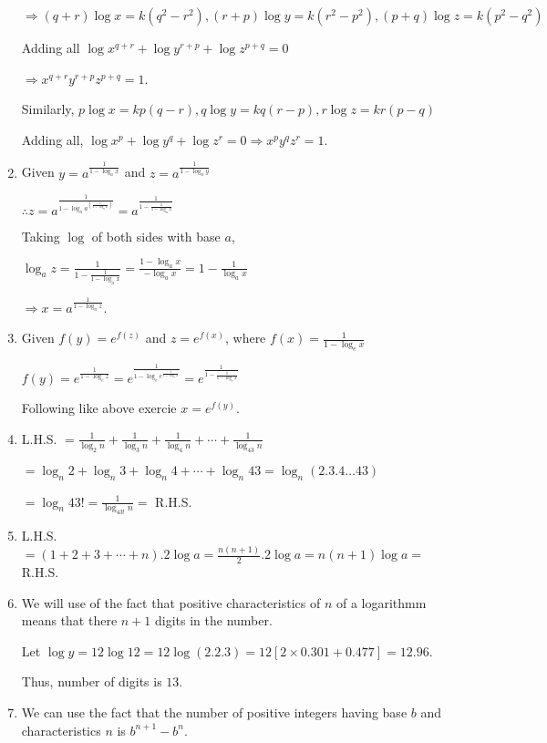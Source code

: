 \begin{enumerate}
  $\Rightarrow (q + r)\log x = k(q^2 - r^2), (r + p)\log y = k(r^2 - p^2), (p + q)\log z = k(p^2 - q^2)$

  Adding all $\log x^{q + r} + \log y^{r + p} + \log z^{p + q} = 0$

  $\Rightarrow x^{q + r}y^{r + p}z^{p + q} = 1$.

  Similarly, $p\log x = kp(q - r), q\log y = kq(r - p), r\log z = kr(p - q)$

  Adding all, $\log x^p + \log y^q + \log z^r = 0 \Rightarrow x^py^qz^r = 1$.
\item Given $y = a^{\tfrac{1}{1 - \log_ax}}$ and $z = a^{\tfrac{1}{1 - \log_ay}}$

  $\therefore z = a^{\tfrac{1}{1 - \log_aa^{\left(\tfrac{1}{1 - \log_ax}\right)}}} = a^{\tfrac{1}{1 - \tfrac{1}{1 - \log_ax}}}$

  Taking $\log$ of both sides with base $a$,

  $\log_az = \frac{1}{1 - \tfrac{1}{1 - \log_ax}} = \frac{1 - \log_ax}{-\log_ax} = 1 - \frac{1}{\log_ax}$

  $\Rightarrow x = a^{\tfrac{1}{1 - \log_az}}$.
\item Given $f(y) = e^{f(z)}$ and $z = e^{f(x)}$, where $f(x) = \frac{1}{1 - \log_ex}$

  $f(y) = e^{\tfrac{1}{1 - \log_ez}} = e^{\tfrac{1}{1 - \log_ee^{\tfrac{1}{1 - \log_ex}}}} = e^{\tfrac{1}{1 - \tfrac{1}{1 -
      \log_ex}}}$

  Following like above exercie $x = e^{f(y)}$.
\item L.H.S. $= \frac{1}{\log_2n} + \frac{1}{\log_3n} + \frac{1}{\log_4n} + \cdots + \frac{1}{\log_{43}n}$

  $= \log_n2 + \log_n3 + \log_n4 + \cdots + \log_n43 = \log_n(2.3.4\ldots 43)$

  $= \log_n43! = \frac{1}{\log_{43!}n} =$ R.H.S.
\item L.H.S. $= (1 + 2 + 3 + \cdots + n).2\log a = \frac{n(n + 1)}{2}.2\log a = n(n + 1)\log a =$ R.H.S.
\item We will use of the fact that positive characteristics of $n$ of a logarithmm means that there $n + 1$ digits in the number.

  Let $\log y = 12\log 12 = 12\log(2.2.3) = 12[2\times0.301 + 0.477] = 12.96$.

  Thus, number of digits is $13$.
\item We can use the fact that the number of positive integers having base $b$ and characteristics $n$ is $b^{n + 1} - b^n$.


\end{enumerate}
